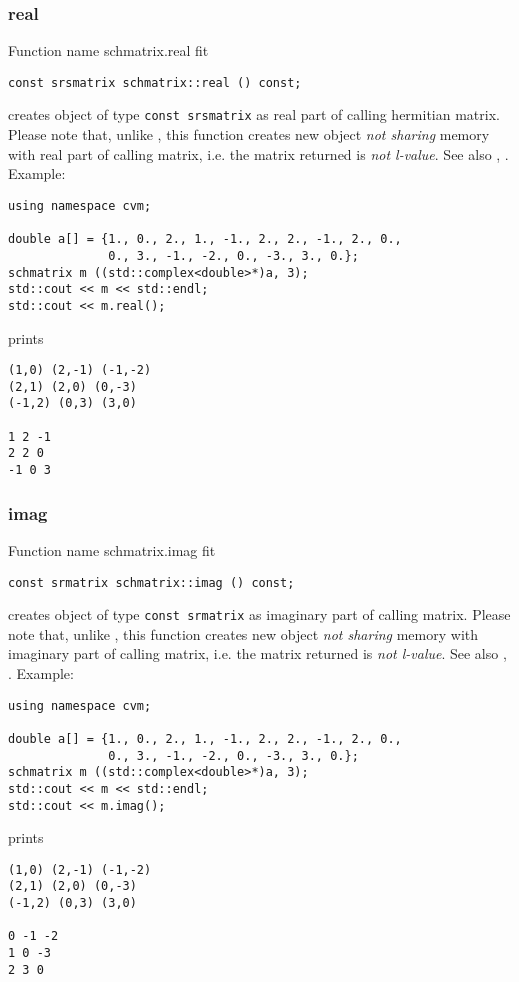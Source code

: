 \subsubsection{real}
Function%
\pdfdest name {schmatrix.real} fit
\begin{verbatim}
const srsmatrix schmatrix::real () const;
\end{verbatim}
creates  object of type \verb"const srsmatrix"
as  real part
of  calling hermitian matrix.
Please note that, unlike
, this
function creates new object \emph{not sharing}  memory
with  real part of  calling matrix, i.e.
the matrix returned is \emph{not  l-value}.
See also
,
.
Example:
\begin{Verbatim}
using namespace cvm;

double a[] = {1., 0., 2., 1., -1., 2., 2., -1., 2., 0.,
              0., 3., -1., -2., 0., -3., 3., 0.};
schmatrix m ((std::complex<double>*)a, 3);
std::cout << m << std::endl;
std::cout << m.real();
\end{Verbatim}
prints
\begin{Verbatim}
(1,0) (2,-1) (-1,-2)
(2,1) (2,0) (0,-3)
(-1,2) (0,3) (3,0)

1 2 -1
2 2 0
-1 0 3
\end{Verbatim}
\newpage




\subsubsection{imag}
Function%
\pdfdest name {schmatrix.imag} fit
\begin{verbatim}
const srmatrix schmatrix::imag () const;
\end{verbatim}
creates  object of type \verb"const srmatrix"
as imaginary part
of  calling matrix.
Please note that, unlike
, this
function creates new object \emph{not sharing}  memory
with  imaginary part of calling matrix, i.e.
the matrix returned is \emph{not  l-value}.
See also
,
.
Example:
\begin{Verbatim}
using namespace cvm;

double a[] = {1., 0., 2., 1., -1., 2., 2., -1., 2., 0.,
              0., 3., -1., -2., 0., -3., 3., 0.};
schmatrix m ((std::complex<double>*)a, 3);
std::cout << m << std::endl;
std::cout << m.imag();
\end{Verbatim}
prints
\begin{Verbatim}
(1,0) (2,-1) (-1,-2)
(2,1) (2,0) (0,-3)
(-1,2) (0,3) (3,0)

0 -1 -2
1 0 -3
2 3 0
\end{Verbatim}
\newpage



